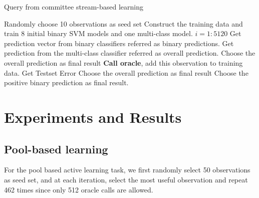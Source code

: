 \documentclass{article}
\begin{document}
\begin{algorithm}[H]
	\caption{Query from committee stream-based learning}
	\begin{algorithmic}
		\State Randomly choose 10 observations as seed set
		\State Construct the training data and train 8 initial binary SVM models and one multi-class model.
		\For $i = 1:5120$
			\State Get prediction vector from binary classifiers referred as binary predictions.
			\State Get prediction from the multi-class classifier referred as overall prediction.
				\State Choose the overall prediction as final result
				\State \textbf{Call oracle}, add this observation to training data.
				\State Get Testset Error
				\State Choose the overall prediction as final result
			\Else {}
				\State Choose the positive binary prediction as final result.
			\EndIf
		\EndFor\\
	\end{algorithmic}
\end{algorithm}



\section{Experiments and Results}

\subsection{Pool-based learning}
For the pool based active learning task, we first randomly select 50 observations as seed set, and at each iteration, select the most useful observation and repeat 462 times since only 512 oracle calls are allowed.
\end{document}
